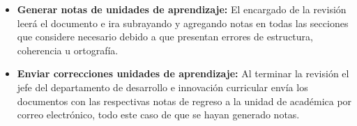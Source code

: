 \begin{itemize}
	\item \textbf{Generar notas de  unidades de aprendizaje:} El encargado de la revisión leerá el documento e ira subrayando y agregando notas en todas las secciones que considere necesario debido a que presentan errores de estructura, coherencia u ortografía.  
	\item \textbf{Enviar correcciones unidades de aprendizaje:} Al terminar la revisión el jefe del departamento de desarrollo e innovación curricular envía los documentos con las respectivas notas de regreso a la unidad de académica por correo electrónico, todo este caso de que se hayan generado notas. 
	
\end{itemize}